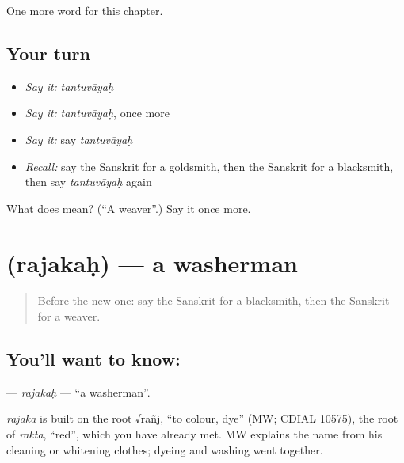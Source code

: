\begin{grammarlens}[title={What you've built}]
One more word for this chapter.
\end{grammarlens}

\subsection*{Your turn}
\begin{itemize}
\raggedright
  \item \emph{Say it:} \emph{tantuvāyaḥ}
  \item \emph{Say it:} \emph{tantuvāyaḥ}, once more
  \item \emph{Say it:} say \emph{tantuvāyaḥ}
  \item \emph{Recall:} say the Sanskrit for a goldsmith, then the Sanskrit for a blacksmith, then say \emph{tantuvāyaḥ} again
\end{itemize}

\begin{tcolorbox}[breakable,colback=teal!4,colframe=teal!35!black,title={Before you move on}]
What does  mean? (\textquotedblleft{}A weaver\textquotedblright{}.) Say it once more.
\end{tcolorbox}
\section[\texorpdfstring{\sk{रजकः} (rajakaḥ)}{रजकः (rajakaḥ)}]{ (rajakaḥ) — a washerman}

\label{lesson:SA-C237-rajakah}



\begin{quote}
Before the new one: say the Sanskrit for a blacksmith, then the Sanskrit for a weaver.
\end{quote}

\subsection*{You'll want to know: }
\textbf{} — \emph{rajakaḥ} — \textquotedblleft{}a washerman\textquotedblright{}.

\begin{cousinweb}
\emph{rajaka} is built on the root √rañj, \textquotedblleft{}to colour, dye\textquotedblright{} (MW; CDIAL 10575), the root of \emph{rakta}, \textquotedblleft{}red\textquotedblright{}, which you have already met. MW explains the name from his cleaning or whitening clothes; dyeing and washing went together.
\end{cousinweb}

